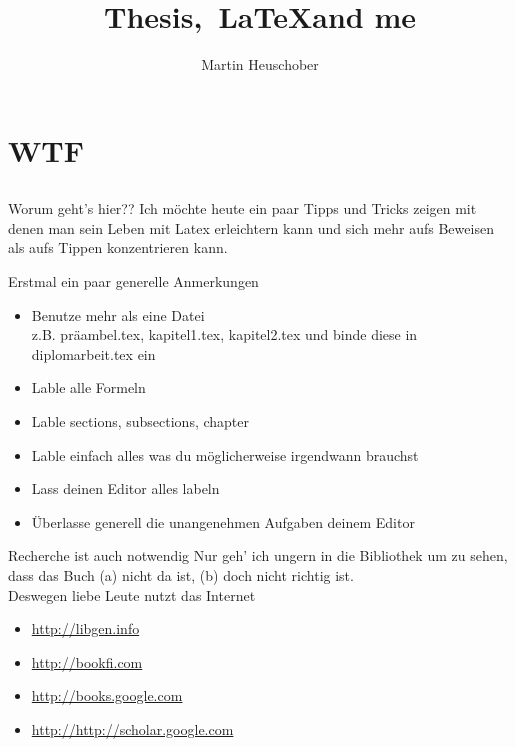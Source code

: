 \documentclass{beamer}
\title{Thesis,~\LaTeX and me}
\author{Martin Heuschober}
\institute{}
\begin{document}
\begin{frame}
    \titlepage
\end{frame}

\begin{frame}
    \tableofcontents
\end{frame}

\section{WTF}
\label{sec:wtf}

\subsection{}
\begin{frame}{Worum geht's hier??}
    Ich möchte heute ein paar Tipps und Tricks zeigen mit denen man sein Leben mit
    Latex erleichtern kann und sich mehr aufs Beweisen als aufs Tippen
    konzentrieren kann.
\end{frame}

\begin{frame}{Erstmal ein paar generelle Anmerkungen}
    \begin{itemize}
        \item Benutze mehr als eine Datei\\
              z.B. präambel.tex, kapitel1.tex, kapitel2.tex und binde diese in
              diplomarbeit.tex ein
        \item Lable alle Formeln
        \item Lable sections, subsections, chapter
        \item Lable einfach alles was du möglicherweise irgendwann brauchst
        \item Lass deinen Editor alles labeln
        \item Überlasse generell die unangenehmen Aufgaben deinem Editor
    \end{itemize}
\end{frame}

\begin{frame}{Recherche ist auch notwendig}
    Nur geh' ich ungern in die Bibliothek um zu sehen, dass das Buch (a) nicht
    da ist, (b) doch nicht richtig ist.\\
    Deswegen liebe Leute nutzt das Internet
    \begin{itemize}
        \item \url{http://libgen.info}
        \item \url{http://bookfi.com}
        \item \url{http://books.google.com}
        \item \url{http://http://scholar.google.com}
    \end{itemize}
\end{frame}
\end{document}
